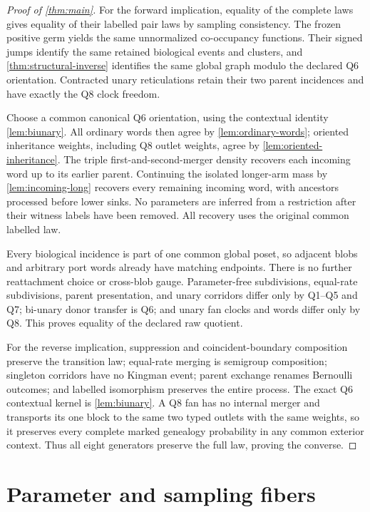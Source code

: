 \documentclass[11pt]{article}
\begin{document}
\begin{proof}[Proof of \cref{thm:main}]
For the forward implication, equality of the complete laws gives equality
of their labelled pair laws by sampling consistency.  The frozen positive
germ yields the same unnormalized co-occupancy functions.  Their signed
jumps identify the same retained biological events and clusters, and
\cref{thm:structural-inverse} identifies the same global graph modulo the
declared Q6 orientation.  Contracted unary reticulations retain their two
parent incidences and have exactly the Q8 clock freedom.

Choose a common canonical Q6 orientation, using the contextual identity
\cref{lem:biunary}.  All ordinary words then agree by
\cref{lem:ordinary-words}; oriented inheritance weights, including Q8
outlet weights, agree by \cref{lem:oriented-inheritance}.  The triple
first-and-second-merger density recovers each incoming word up to its
earlier parent.  Continuing the isolated longer-arm mass by
\cref{lem:incoming-long} recovers every remaining incoming word, with
ancestors processed before lower sinks.  No parameters are inferred from a
restriction after their witness labels have been removed.  All recovery
uses the original common labelled law.

Every biological incidence is part of one common global poset, so adjacent
blobs and arbitrary port words already have matching endpoints.  There is
no further reattachment choice or cross-blob gauge.  Parameter-free
subdivisions, equal-rate subdivisions, parent presentation, and unary
corridors differ only by Q1--Q5 and Q7; bi-unary donor transfer is Q6; and
unary fan clocks and words differ only by Q8.  This proves equality of the
declared raw quotient.

For the reverse implication, suppression and coincident-boundary
composition preserve the transition law; equal-rate merging is semigroup
composition; singleton corridors have no Kingman event; parent exchange
renames Bernoulli outcomes; and labelled isomorphism preserves the entire
process.  The exact Q6 contextual kernel is \cref{lem:biunary}.  A Q8 fan
has no internal merger and transports its one block to the same two typed
outlets with the same weights, so it preserves every complete marked
genealogy probability in any common exterior context.  Thus all eight
generators preserve the full law, proving the converse.
\end{proof}

\section{Parameter and sampling fibers}
\label{sec:parameters}
\end{document}

